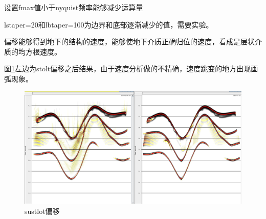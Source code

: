 设置fmax值小于nyquist频率能够减少运算量\par
lstaper=20和lbtaper=100为边界和底部逐渐减少的值，需要实验。\par
偏移能够得到地下的结构的速度，能够使地下介质正确归位的速度，看成是层状介质的均方根速度。\par
图\ref{fig:sustlot}左边为stolt偏移之后结果，由于速度分析做的不精确，速度跳变的地方出现画弧现象。\\
\begin{figure}[htbp]
	\centering
	\includegraphics[bb=0 0 1295 678,scale=.25]{SU/fig/stoltmig.png}
	\caption{sustlot偏移}
	\label{fig:sustlot}
\end{figure}
